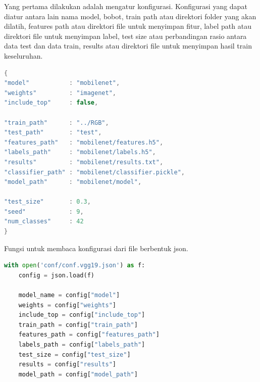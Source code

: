 \par Yang pertama dilakukan adalah mengatur konfigurasi. Konfigurasi yang dapat diatur antara lain nama model, bobot, train path atau direktori folder yang akan dilatih, features path atau direktori file untuk menyimpan fitur, label path atau direktori file untuk menyimpan label, test size atau perbandingan rasio antara data test dan data train, results atau direktori file untuk menyimpan hasil train keseluruhan. 
\begin{lstlisting}[language=java, caption=Konfigurasi, label=code:config, firstnumber=1]
{
"model"           : "mobilenet",
"weights"         : "imagenet",
"include_top"     : false,

"train_path"      : "../RGB",
"test_path"		  : "test",
"features_path"   : "mobilenet/features.h5",
"labels_path"     : "mobilenet/labels.h5",
"results"         : "mobilenet/results.txt",
"classifier_path" : "mobilenet/classifier.pickle",
"model_path"	  : "mobilenet/model",

"test_size"       : 0.3,
"seed"            : 9,
"num_classes"     : 42
}
\end{lstlisting}
\par Fungsi untuk membaca konfigurasi dari file berbentuk json. 
\mbox{}
\mbox{}
\begin{lstlisting}[language=python, caption=Membaca konfigurasi, label=code:open_config, firstnumber=37]
	with open('conf/conf.vgg19.json') as f:
	config = json.load(f)
	
	model_name = config["model"]
	weights = config["weights"]
	include_top = config["include_top"]
	train_path = config["train_path"]
	features_path = config["features_path"]
	labels_path = config["labels_path"]
	test_size = config["test_size"]
	results = config["results"]
	model_path = config["model_path"]
\end{lstlisting}


